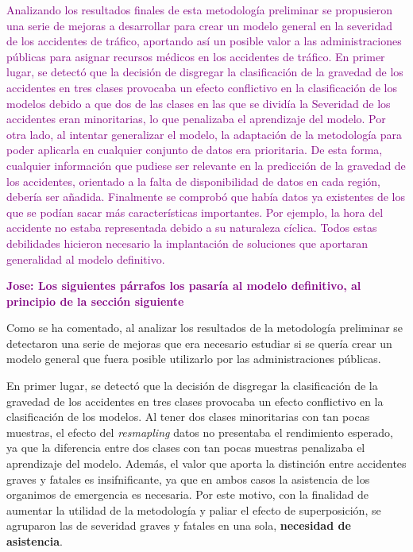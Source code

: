 \documentclass{uathesis-es}
\begin{document}
{\textcolor{purple}{Analizando los resultados finales de esta metodología preliminar se propusieron una serie de mejoras a desarrollar para crear un modelo general en la severidad de los accidentes de tráfico, aportando así un posible valor a las administraciones públicas para asignar recursos médicos en los accidentes de tráfico. En primer lugar, se detectó que la decisión de disgregar la clasificación de la gravedad de los accidentes en tres clases provocaba un efecto conflictivo en la clasificación de los modelos debido a que dos de las clases en las que se dividía la Severidad de los accidentes eran minoritarias, lo que penalizaba el aprendizaje del modelo. Por otra lado, al intentar generalizar el modelo, la adaptación de la metodología para poder aplicarla en cualquier conjunto de datos era prioritaria. De esta forma, cualquier información que pudiese ser relevante en la predicción de la gravedad de los accidentes, orientado a la falta de disponibilidad de datos en cada región, debería ser añadida. Finalmente se comprobó que había datos ya existentes de los que se podían sacar más características importantes. Por ejemplo, la hora del accidente no estaba representada debido a su naturaleza cíclica. Todos estas debilidades hicieron necesario la implantación de soluciones que aportaran generalidad al modelo definitivo.}

\textcolor{purple}{\textbf{Jose: Los siguientes párrafos los pasaría al modelo definitivo, al principio de la sección siguiente}}

Como se ha comentado, al analizar los resultados de la metodología preliminar se detectaron una serie de mejoras que era necesario estudiar si se quería  crear un modelo general que fuera posible utilizarlo por las administraciones públicas.

En primer lugar, se detectó que la decisión de disgregar la clasificación de la gravedad de los accidentes en tres clases provocaba un efecto conflictivo en la clasificación de los modelos. Al tener dos clases minoritarias con tan pocas muestras, el efecto del \textit{resmapling} datos no presentaba el rendimiento esperado, ya que la diferencia entre dos clases con tan pocas muestras penalizaba el aprendizaje del modelo. Además, el valor que aporta la distinción entre accidentes graves y fatales es insifnificante, ya que en ambos casos la asistencia de los organimos de emergencia es necesaria. Por este motivo, con la finalidad de aumentar la utilidad de la metodología y paliar el efecto de superposición, se agruparon las de severidad graves y fatales en una sola, \textbf{necesidad de asistencia}.

}
\end{document}
